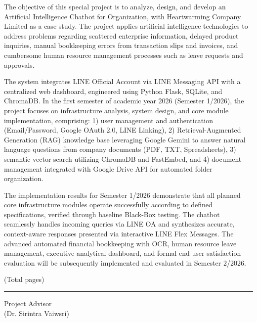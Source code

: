 \hspace*{1.5em}The objective of this special project is to analyze, design, and develop an Artificial Intelligence Chatbot for Organization, with Heartwarming Company Limited as a case study. The project applies artificial intelligence technologies to address problems regarding scattered enterprise information, delayed product inquiries, manual bookkeeping errors from transaction slips and invoices, and cumbersome human resource management processes such as leave requests and approvals.

\hspace*{1.5em}The system integrates LINE Official Account via LINE Messaging API with a centralized web dashboard, engineered using Python Flask, SQLite, and ChromaDB. In the first semester of academic year 2026 (Semester 1/2026), the project focuses on infrastructure analysis, system design, and core module implementation, comprising: 1) user management and authentication (Email/Password, Google OAuth 2.0, LINE Linking), 2) Retrieval-Augmented Generation (RAG) knowledge base leveraging Google Gemini to answer natural language questions from company documents (PDF, TXT, Spreadsheets), 3) semantic vector search utilizing ChromaDB and FastEmbed, and 4) document management integrated with Google Drive API for automated folder organization.

\hspace*{1.5em}The implementation results for Semester 1/2026 demonstrate that all planned core infrastructure modules operate successfully according to defined specifications, verified through baseline Black-Box testing. The chatbot seamlessly handles incoming queries via LINE OA and synthesizes accurate, context-aware responses presented via interactive LINE Flex Messages. The advanced automated financial bookkeeping with OCR, human resource leave management, executive analytical dashboard, and formal end-user satisfaction evaluation will be subsequently implemented and evaluated in Semester 2/2026.

\vspace{1mm}
\begin{flushright}
(Total \pageref{LastPage} pages)

\vspace{2mm}
\rule{8 cm}{0.4pt} Project Advisor\\
(Dr. Sirintra Vaiwsri)
\end{flushright}


\newpage
{}
{}

